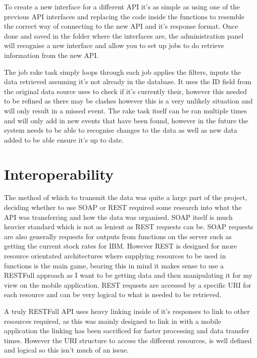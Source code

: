 		To create a new interface for a different API it's as simple as using one of the previous API interfaces and replacing the code inside the functions to resemble the correct way of connecting to the new API and it's response format. Once done and saved in the folder where the interfaces are, the administration panel will recognise a new interface and allow you to set up jobs to do retrieve information from the new API. 

		The job rake task simply loops through each job applies the filters, inputs the data retrieved assuming it's not already in the database. It uses the ID field from the original data source uses to check if it's currently their, however this needed to be refined as there may be clashes however this is a very unlikely situation and will only result in a missed event. The rake task itself can be ran multiple times and will only add in new events that have been found, however in the future the system needs to be able to recognise changes to the data as well as new data added to be able ensure it's up to date. 

	\section{Interoperability}
		The method of which to transmit the data was quite a large part of the project, deciding whether to use SOAP or REST required some research into what the API was transferring and how the data was organised. SOAP itself is much heavier standard which is not as lenient as REST requests can be. SOAP requests are also generally requests for outputs from functions on the server such as getting the current stock rates for IBM. However REST is designed for more resource orientated architectures where supplying resources to be used in functions is the main game, bearing this in mind it makes sense to use a RESTFull approach as I want to be getting data and then manipulating it for my view on the mobile application. REST requests are accessed by a specific URI for each resource and can be very logical to what is needed to be retrieved. 

		A truly RESTFull API uses heavy linking inside of it's  responses to link to other resources required, as this was mainly designed to link in with a mobile application the linking has been sacrificed for faster processing and data transfer times. However the URI structure to access the different resources, is well defined and logical so this isn't much of an issue.

